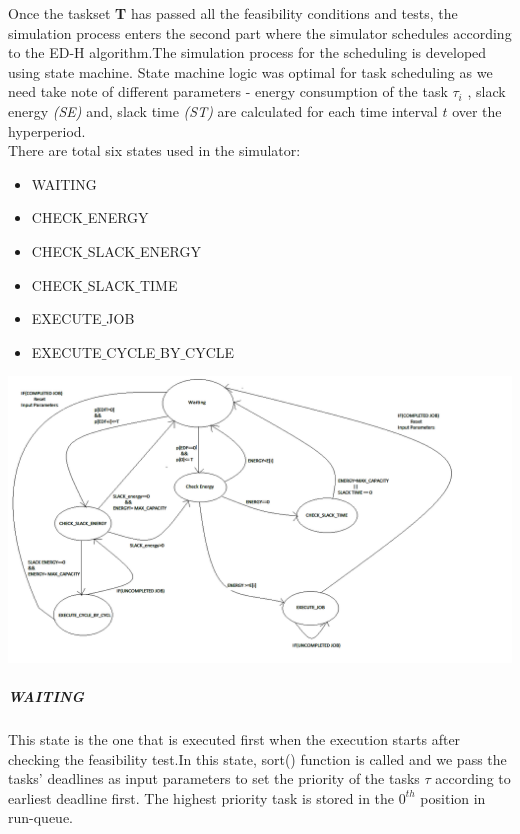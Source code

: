 \documentclass[12pt,hidelinks]{article}
\begin{document}
{Once the taskset \textbf{T} has passed all the feasibility conditions and tests, the simulation process enters the second part where the simulator schedules according to the ED-H algorithm.The simulation process for the scheduling is developed using state machine.\newline
State machine logic was optimal for task scheduling as we need take note of different parameters - energy consumption of the task  {$\tau_i$} , slack energy \textit{(SE)} and, slack time  \textit{(ST)} are calculated for each time interval \textit{$t$} over the hyperperiod.\newline \\
There are total six states used in the simulator: 
\begin{itemize}
    \item WAITING
    \item CHECK$\_$ENERGY
    \item CHECK$\_$SLACK$\_$ENERGY
    \item CHECK$\_$SLACK$\_$TIME
    \item EXECUTE$\_$JOB
    \item EXECUTE$\_$CYCLE$\_$BY$\_$CYCLE
\end{itemize}

\begin{center}
    \includegraphics[width=1.0\linewidth]{CODE_STATE_MACHINE (2).png}
\end{center}

\subparagraph{WAITING}\hfill
\newline

This state is the one that is executed first when the execution starts after checking the feasibility test.In this state, sort() function is called and we pass the tasks' deadlines as input parameters to set the priority of the tasks {$\tau$} according to earliest deadline first. The highest priority task is stored in the $0^{th}$ position in run-queue.\newline

}
\end{document}
